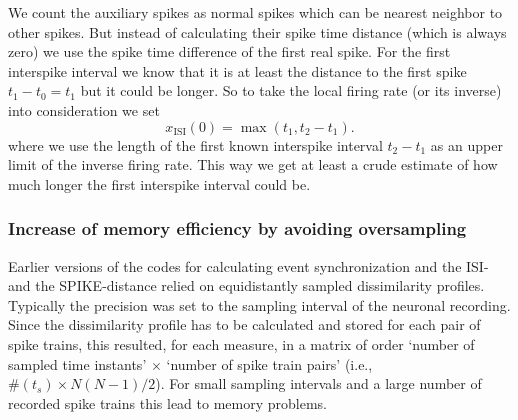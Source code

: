 \documentclass[10pt,twocolumn]{elsart5p}
\begin{document}
We count the auxiliary spikes as normal spikes which can be nearest neighbor to other spikes. But instead of calculating their spike time distance (which is always zero) we use the spike time difference of the first real spike. For the first interspike interval we know that it is at least the distance to the first spike $t_1-t_0 = t_1$ but it could be longer. So to take the local firing rate (or its inverse) into consideration we set
%
\begin{equation} \label{eq:Corrected-First-ISI}
    x_{\mathrm {ISI}} (0) = \max ( t_1, t_2 - t_1 ).
\end{equation}
%
where we use the length of the first known interspike interval $t_2-t_1$ as an upper limit of the inverse firing rate. This way we get at least a crude estimate of how much longer the first interspike interval could be.


\subsubsection{\label{sss:Sampling} Increase of memory efficiency by avoiding oversampling}

Earlier versions of the codes for calculating event synchronization and the ISI- and the SPIKE-distance relied on equidistantly sampled dissimilarity profiles. Typically the precision was set to the sampling interval of the neuronal recording. Since the dissimilarity profile has to be calculated and stored for each pair of spike trains, this resulted, for each measure, in a matrix of order `number of sampled time instants' $\times$ `number of spike train pairs' (i.e., $\# (t_s) \times N(N-1)/2$). For small sampling intervals and a large number of recorded spike trains this lead to memory problems.
\end{document}
